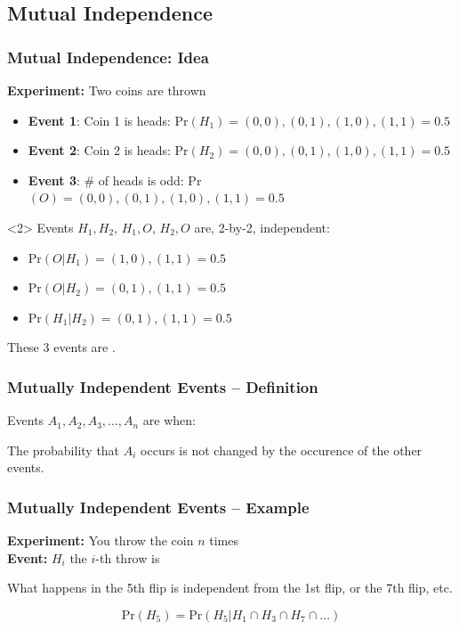 \documentclass{beamer}
\begin{document}
\subsection{Mutual Independence}

\begin{frame}
  \frametitle{Mutual Independence: Idea}

  {\bf Experiment:} Two coins are thrown
  \begin{itemize}
  \item {\bf Event 1}: Coin 1 is heads: Pr$(H_1) = (0,0),(0,1),(1,0),(1,1) = 0.5$
  \item {\bf Event 2}: Coin 2 is heads: Pr$(H_2) = (0,0),(0,1),(1,0),(1,1) = 0.5$
  \item {\bf Event 3}: \# of heads is odd: Pr$(O) = (0,0),(0,1),(1,0),(1,1) = 0.5$
  \end{itemize}

  \vfill

  \begin{onlyenv}<2>
  Events $H_1,H_2$, $H_1,O$, $H_2,O$ are, \alert{2-by-2}, independent:
  \begin{itemize}
  \item Pr$(O|H_1) = (1,0), (1,1) = 0.5$
  \item Pr$(O|H_2) = (0,1), (1,1) = 0.5$
  \item Pr$(H_1|H_2) = (0,1), (1,1) = 0.5$
  \end{itemize}

  \bigskip

  These 3 events are .
  \end{onlyenv}
\end{frame}

\begin{frame}
  \frametitle{Mutually Independent Events -- Definition}

  Events $A_1, A_2, A_3, \ldots, A_n$ are  when:

  \vfill
  
  The probability that $A_i$ occurs is not changed by the occurence of
  the other events.
\end{frame}

\begin{frame}
  \frametitle{Mutually Independent Events -- Example}

  {\bf Experiment:} You throw the coin $n$ times\\
  {\bf Event:} $H_i$ the $i$-th throw is 

  \vfill

  What happens in the 5th flip is independent from the 1st flip, or
  the 7th flip, etc.

  \bigskip
  
  \begin{equation*}
    \text{Pr}(H_5) = \text{Pr}(H_5|H_1 \cap H_3 \cap H_7 \cap \ldots)
  \end{equation*}
\end{frame}
\end{document}
